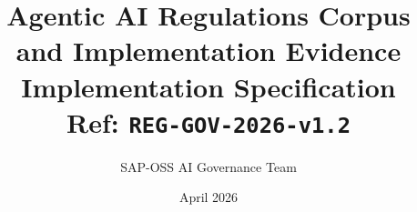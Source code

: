 \documentclass[11pt,a4paper,twoside]{report}
\begin{document}
\title{\vspace{-2em}\Large Agentic AI Regulations Corpus \\
       \textbf{and Implementation Evidence} \\
       \large Implementation Specification \\
       \small Ref: \texttt{REG-GOV-2026-v1.2}}
\author{SAP-OSS AI Governance Team}
\date{April 2026}

\maketitle



















\end{document}
